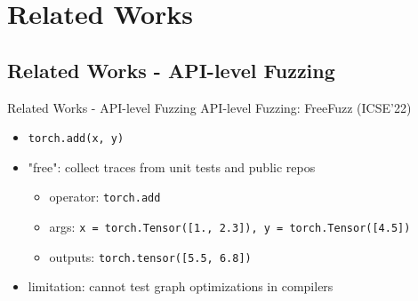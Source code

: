 \documentclass{beamer}
\begin{document}
\section{Related Works}
\subsection{Related Works - API-level Fuzzing}
\begin{frame}{Related Works - API-level Fuzzing}
    API-level Fuzzing: FreeFuzz (ICSE'22)
    \begin{itemize}
        \item \texttt{torch.add(x, y)}
        \item "free": collect traces from unit tests and public repos
        \begin{itemize}
            \item operator: \texttt{torch.add}
            \item args: \texttt{x = torch.Tensor([1., 2.3]), y = torch.Tensor([4.5])}
            \item outputs: \texttt{torch.tensor([5.5, 6.8])}
        \end{itemize}
        \item limitation: cannot test graph optimizations in compilers
    \end{itemize}
\end{frame}
\end{document}
